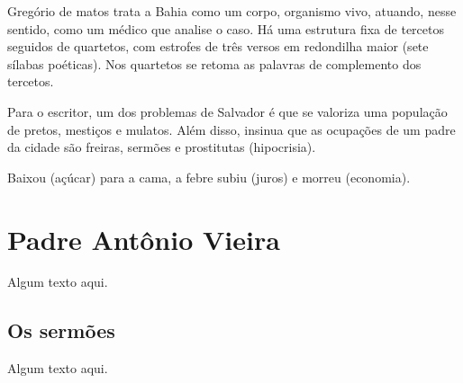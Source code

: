 Gregório de matos trata a Bahia como um corpo, organismo vivo, atuando, nesse sentido, como um médico que analise o caso. Há uma estrutura fixa de tercetos seguidos de quartetos, com estrofes de três versos em redondilha maior (sete sílabas poéticas). Nos quartetos se retoma as palavras de complemento dos tercetos.

Para o escritor, um dos problemas de Salvador é que se valoriza uma população de pretos, mestiços e mulatos. Além disso, insinua que as ocupações de um padre da cidade são freiras, sermões e prostitutas (hipocrisia).

Baixou (açúcar) para a cama, a febre subiu (juros) e morreu (economia).

\section{Padre Antônio Vieira}

Algum texto aqui.

\subsection{Os sermões}

Algum texto aqui.